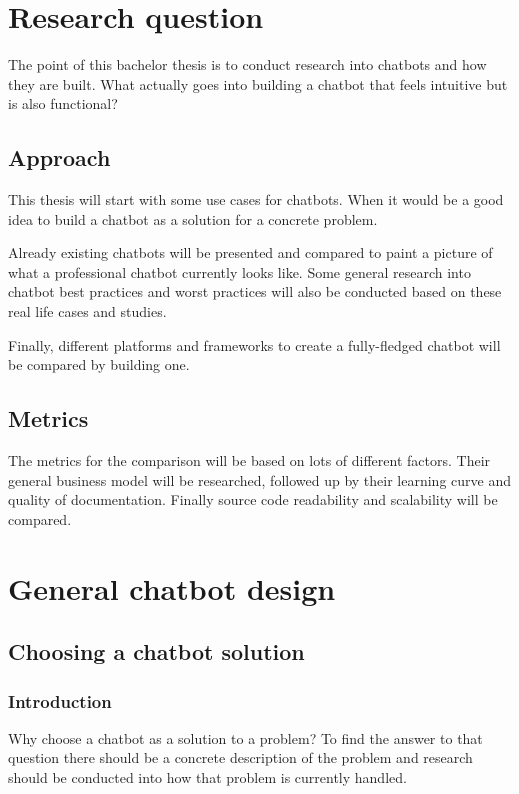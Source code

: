 \chapter{Research question}

The point of this bachelor thesis is to conduct research into chatbots and how they are built. What actually goes into building a chatbot that feels intuitive but is also functional?

\section{Approach}

This thesis will start with some use cases for chatbots. When it would be a good idea to build a chatbot as a solution for a concrete problem.

Already existing chatbots will be presented and compared to paint a picture of what a professional chatbot currently looks like.
Some general research into chatbot best practices and worst practices will also be conducted based on these real life cases and studies.

Finally, different platforms and frameworks to create a fully-fledged chatbot will be compared by building one.

\section{Metrics}

The metrics for the comparison will be based on lots of different factors. Their general business model will be researched, followed up by their learning curve and quality of documentation. Finally source code readability and scalability will be compared.

\chapter{General chatbot design}

\section{Choosing a chatbot solution}

\subsection{Introduction}

Why choose a chatbot as a solution to a problem? To find the answer to that question there should be a concrete description of the problem and research should be conducted into how that problem is currently handled.

